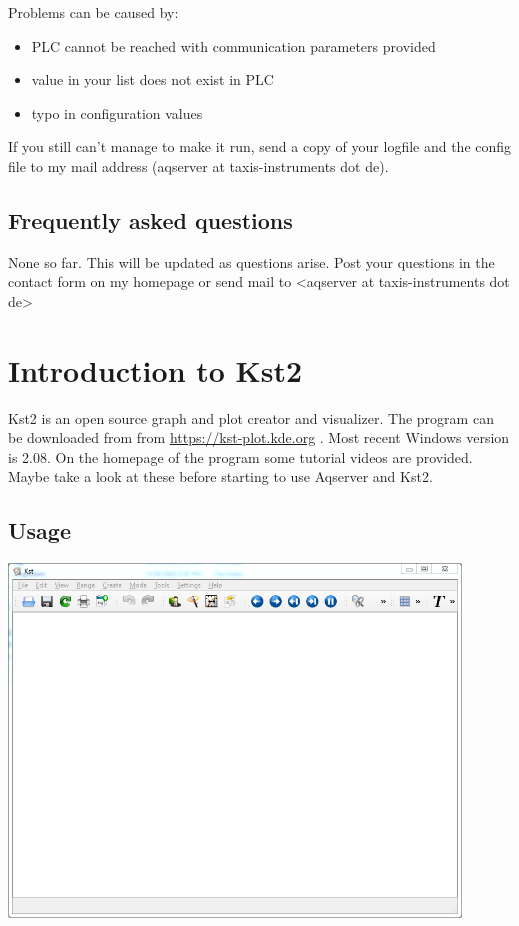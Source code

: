 \documentclass[a4paper,10pt,english]{sphinxmanual}
\begin{document}
Problems can be caused by:
\begin{itemize}
\item {} 
PLC cannot be reached with communication parameters provided

\item {} 
value in your list does not exist in PLC

\item {} 
typo in configuration values

\end{itemize}

If you still can't manage to make it run, send a copy of your logfile and the config file to my mail address (aqserver at taxis-instruments dot de).


\section{Frequently asked questions}
\label{problems:frequently-asked-questions}
None so far. This will be updated as questions arise. Post your questions in the contact form on my homepage or send mail to  \textless{}aqserver at taxis-instruments dot de\textgreater{}


\chapter{Introduction to Kst2}
\label{kst::doc}\label{kst:introduction-to-kst2}
Kst2 is an open source graph and plot creator and visualizer. The program can be downloaded from from \href{https://kst-plot.kde.org}{https://kst-plot.kde.org} . Most recent Windows version is 2.08.
On the homepage of the program some tutorial videos are provided. Maybe take a look at these before starting to use Aqserver and Kst2.


\section{Usage}
\label{kst:usage}
{\hfill\includegraphics[width=12cm]{main.png}\hfill}
\end{document}
